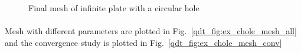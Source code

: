 \begin{figure}
    \centering
    \caption[Final mesh of infinite plate with a circular hole]{Final mesh of infinite plate with a circular hole}
    \label{qdt_fig:ex_chole_mesh_final}
\end{figure}
\paragraph{}
Mesh with different parameters are plotted in Fig.~\ref{qdt_fig:ex_chole_mesh_all} and the convergence study is plotted in Fig.~\ref{qdt_fig:ex_chole_mesh_conv}

